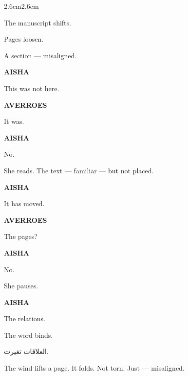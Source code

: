 \begin{adjustwidth}{2.6cm}{2.6cm}

The manuscript shifts.

\medskip

Pages loosen.

\medskip

A section --- misaligned.

\vspace{2em}

\textbf{AISHA}

This was not here.

\medskip

\textbf{AVERROES}

It was.

\medskip

\textbf{AISHA}

No.

\medskip

She reads. The text --- familiar --- but not placed.

\vspace{2em}

\textbf{AISHA}

It has moved.

\medskip

\textbf{AVERROES}

The pages?

\medskip

\textbf{AISHA}

No.

\medskip

She pauses.

\medskip

\textbf{AISHA}

The relations.

\medskip


\medskip

The word binds.

\vspace{2em}

\begin{AR}
العلاقات تغيرت.
\end{AR}

\vspace{2em}

The wind lifts a page. It folds. Not torn. Just --- misaligned.

\vspace{2em}


\end{adjustwidth}
